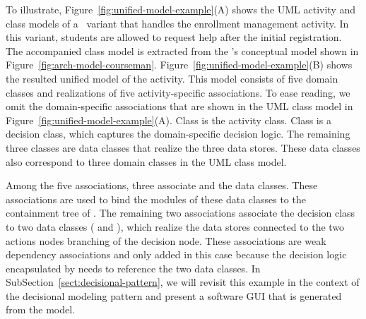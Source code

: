 To illustrate, Figure~\ref{fig:unified-model-example}(A) shows the UML activity and class models of a \courseman~variant that handles the enrollment management activity. In this variant, students are allowed to request help after the initial registration. The accompanied class model is extracted from the \courseman's conceptual model shown in Figure~\ref{fig:arch-model-courseman}.
%
Figure~\ref{fig:unified-model-example}(B) shows the resulted unified model of the activity.
This model consists of five domain classes and realizations of five activity-specific associations. To ease reading, we omit the domain-specific associations that are shown in the UML class model in Figure~\ref{fig:unified-model-example}(A). Class  is the activity class. Class  is a decision class, which captures the domain-specific decision logic. The remaining three classes are data classes that realize the three data stores. These data classes also correspond to three domain classes in the UML class model. 

Among the five associations, three associate  and the data classes. These associations are used to bind the modules of these data classes to the containment tree of .
The remaining two associations associate the decision class  to two data classes ( and ), which realize the data stores connected to the two actions nodes branching of the decision node. These associations are weak dependency associations and only added in this case because the decision logic encapsulated by  needs to reference the two data classes.
%
In SubSection~\ref{sect:decisional-pattern}, we will revisit this example in the context of the decisional modeling pattern and present a software GUI that is generated from the model.

